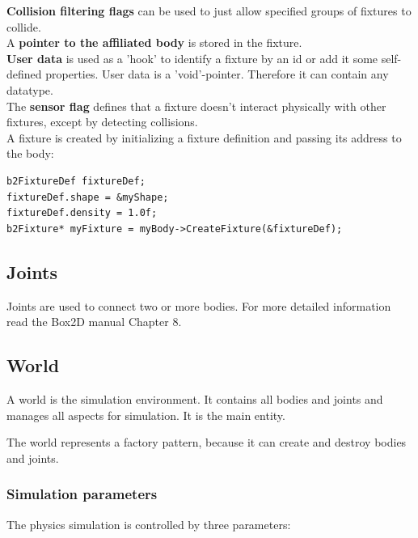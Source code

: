 \documentclass[10pt,a4paper,DIV=11]{scrreprt}
\begin{document}
\textbf{Collision filtering flags} can be used to just allow specified groups of fixtures to collide. \\

A \textbf{pointer to the affiliated body} is stored in the fixture.\\

\textbf{User data} is used as a 'hook' to identify a fixture by an id or add it some self-defined properties. User data is a 'void'-pointer. Therefore it can contain any datatype. \\

The \textbf{sensor flag} defines that a fixture doesn't interact physically with other fixtures, except by detecting collisions. \\



A fixture is created by initializing a fixture definition and passing its address to the body:

\begin{lstlisting}[caption={Creation of a fixture \cite{box}},label=lst:fixture-create]
b2FixtureDef fixtureDef;
fixtureDef.shape = &myShape;
fixtureDef.density = 1.0f;
b2Fixture* myFixture = myBody->CreateFixture(&fixtureDef);
\end{lstlisting}


\subsection{Joints}
Joints are used to connect two or more bodies. For more detailed information read the Box2D manual Chapter 8.\cite{box}

\subsection{World}
A world is the simulation environment. It contains all bodies and joints and manages all aspects for simulation. It is the main entity.

The world represents a factory pattern, because it can create and destroy bodies and joints.

\subsubsection*{Simulation parameters}
The physics simulation is controlled by three parameters: \\

   \\
\\
\end{document}
